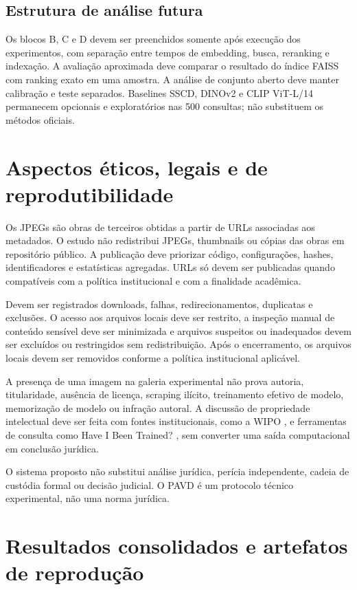 \documentclass[12pt]{article}
\newcommand{\pavd}{PAVD}
\newcommand{\faiss}{FAISS}
\begin{document}
\subsection{Estrutura de análise futura}

Os blocos B, C e D devem ser preenchidos somente após execução dos
experimentos, com separação entre tempos de embedding, busca, reranking e
indexação. A avaliação aproximada deve comparar o resultado do índice
\faiss{} com ranking exato em uma amostra. A análise de conjunto aberto deve
manter calibração e teste separados. Baselines SSCD, DINOv2 e CLIP ViT-L/14
permanecem opcionais e exploratórios nas 500 consultas; não substituem os
métodos oficiais.

\section{Aspectos éticos, legais e de reprodutibilidade}

Os JPEGs são obras de terceiros obtidas a partir de URLs associadas aos
metadados. O estudo não redistribui JPEGs, thumbnails ou cópias das obras em
repositório público. A publicação deve priorizar código, configurações,
hashes, identificadores e estatísticas agregadas. URLs só devem ser
publicadas quando compatíveis com a política institucional e com a finalidade
acadêmica.

Devem ser registrados downloads, falhas, redirecionamentos, duplicatas e
exclusões. O acesso aos arquivos locais deve ser restrito, a inspeção manual
de conteúdo sensível deve ser minimizada e arquivos suspeitos ou inadequados
devem ser excluídos ou restringidos sem redistribuição. Após o encerramento,
os arquivos locais devem ser removidos conforme a política institucional
aplicável.

A presença de uma imagem na galeria experimental não prova autoria,
titularidade, ausência de licença, scraping ilícito, treinamento efetivo de
modelo, memorização de modelo ou infração autoral. A discussão de propriedade
intelectual deve ser feita com fontes institucionais, como a WIPO
\cite{wipo2024ai}, e ferramentas de consulta como Have I Been Trained?
\cite{spawninghibt}, sem converter uma saída computacional em conclusão
jurídica.

O sistema proposto não substitui análise jurídica, perícia independente,
cadeia de custódia formal ou decisão judicial. O \pavd{} é um protocolo
técnico experimental, não uma norma jurídica.

\section{Resultados consolidados e artefatos de reprodução}
\end{document}
